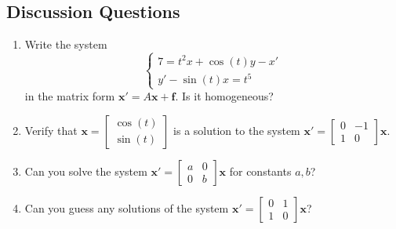 \documentclass[12pt]{amsart}
\numberwithin{equation}{section}
\theoremstyle{plain} %
\theoremstyle{definition}
\theoremstyle{remark}
\begin{document}
\subsection*{Discussion Questions}
\begin{enumerate}
\item Write the system 
\[\begin{cases} 7 = t^2 x + \cos(t) y - x' \\
y' -  \sin(t) x=  t^5
\end{cases}\]
in the matrix form $\mathbf{x'} = A\mathbf{x} + \mathbf{f}$. Is it homogeneous?
\item Verify that $\mathbf{x} = \begin{bmatrix} \cos(t) \\ \sin(t) \end{bmatrix}$ is a solution to the system  $\mathbf{x'} = \begin{bmatrix} 0 & -1 \\ 1 & 0\end{bmatrix} \mathbf{x}$.
\item Can you solve the system $\mathbf{x'} = \begin{bmatrix} a & 0 \\ 0 & b\end{bmatrix} \mathbf{x}$ for constants $a,b$?
\item Can you guess any solutions of the system $\mathbf{x'} = \begin{bmatrix} 0 & 1 \\ 1 & 0\end{bmatrix} \mathbf{x}$?
\end{enumerate}
\end{document}
